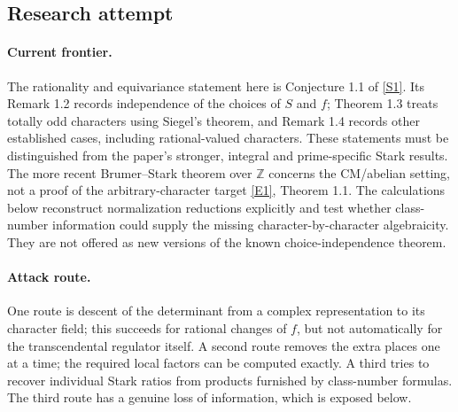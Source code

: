 \documentclass[11pt,a4paper]{article}
\newcommand{\Z}{\mathbb{Z}}
\newcommand{\sref}[2]{\hyperlink{source:#1:#2}{[S#2]}}
\newcommand{\eref}[2]{\hyperlink{extra:#1:#2}{[E#2]}}
\numberwithin{equation}{section}
\begin{document}
\subsection{Research attempt}

\paragraph{Current frontier.}
The rationality and equivariance statement here is Conjecture 1.1 of
\sref{statement}{1}. Its Remark 1.2 records independence of the choices of $S$
and $f$; Theorem 1.3 treats totally odd characters using Siegel's theorem,
and Remark 1.4 records other established cases, including rational-valued
characters. These statements must be distinguished from the paper's
stronger, integral and prime-specific Stark results. The more recent
Brumer--Stark theorem over $\Z$ concerns the CM/abelian setting, not a
proof of the arbitrary-character target \eref{statement}{1}, Theorem 1.1.
The calculations below reconstruct normalization reductions explicitly
and test whether class-number information could supply the missing
character-by-character algebraicity. They are not offered as new
versions of the known choice-independence theorem.

\paragraph{Attack route.}
One route is descent of the determinant from a complex representation
to its character field; this succeeds for rational changes of $f$, but
not automatically for the transcendental regulator itself. A second
route removes the extra places one at a time; the required local
factors can be computed exactly. A third tries to recover individual
Stark ratios from products furnished by class-number formulas. The
third route has a genuine loss of information, which is exposed below.
\end{document}
